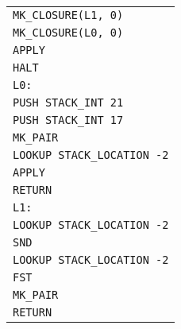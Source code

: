 \begin{tabular}{l}
\\[-0.5ex]
{\verb!MK_CLOSURE(L1, 0)!}              \\ %
{\verb!MK_CLOSURE(L0, 0)!}              \\ %
{\verb!APPLY!}                          \\ %
{\verb!HALT!}                           \\[1ex] %
{\verb!L0:!}         \\ %
{\verb!PUSH STACK_INT 21!}         \\ %
{\verb!PUSH STACK_INT 17!}              \\ %
{\verb!MK_PAIR!}                        \\ %
{\verb!LOOKUP STACK_LOCATION -2!}       \\ %
{\verb!APPLY!}                          \\ %
{\verb!RETURN!}                         \\[1ex] %
{\verb!L1:!}  \\ %
{\verb!LOOKUP STACK_LOCATION -2!}  \\ %
{\verb!SND!}                            \\ %
{\verb!LOOKUP STACK_LOCATION -2!}       \\ %
{\verb!FST!}                            \\ %
{\verb!MK_PAIR!}                        \\ %
{\verb!RETURN!}                         \\ %
\end{tabular}